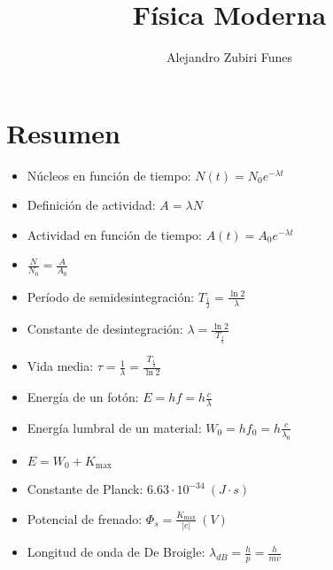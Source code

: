 \documentclass{article}
\title{Física Moderna}
\author{Alejandro Zubiri Funes}
\date{}
\begin{document}
\maketitle
\section*{Resumen}
\begin{itemize}
    \item Núcleos en función de tiempo: $N(t)=N_0e^{-\lambda t}$
    \item Definición de actividad: $A=\lambda N$
    \item Actividad en función de tiempo: $A(t)=A_0e^{-\lambda t}$
    \item  $\frac{N}{N_0}=\frac{A}{A_0}$
    \item Período de semidesintegración: $T_{\frac{1}{2}}= \frac{\ln 2}{\lambda}$
    \item Constante de desintegración: $\lambda = \frac{\ln 2}{T_{\frac{1}{2}}}$
    \item Vida media: $\tau = \frac{1}{\lambda}=\frac{T_{\frac{1}{2}}}{\ln 2}$
    \item Energía de un fotón: $E=hf=h \frac{c}{\lambda}$
    \item Energía lumbral de un material: $W_0=hf_0= h \frac{c}{\lambda_0}$
    \item $E=W_0+K_{\text{max}}$
    \item Constante de Planck: $6.63\cdot 10^{-34}\:(J\cdot s)$
    \item Potencial de frenado: $\Phi_s= \frac{K_{\text{max}}}{|e|}\:(V)$
    \item Longitud de onda de De Broigle: $\lambda_{dB}= \frac{h}{p}= \frac{h}{mv}$ 
\end{itemize}
\end{document}
